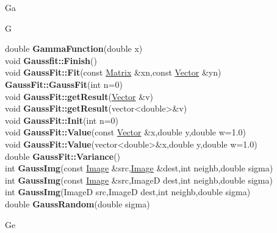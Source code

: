 \documentclass[10pt,titlepage]{article}
\def\functionlistentry#1#2#3#4#5#6{\noindent #1 {\bf #2}(#3) \dotfill #6\\}
\def\letterref#1{}
\def\letterlabel#1{\vspace{0.5cm}\centerline{\Large #1}}
\def\letterlabelend#1{}
\begin{document}
{{\letterlabel{Ga}
\letterlabel{G}
\letterref{A}
\letterref{B}
\letterref{C}
\letterref{D}
\letterref{E}
\letterref{F}
\letterref{G}
\letterref{H}
\letterref{I}
\letterref{K}
\letterref{L}
\letterref{M}
\letterref{N}
\letterref{O}
\letterref{P}
\letterref{Q}
\letterref{R}
\letterref{S}
\letterref{T}
\letterref{U}
\letterref{V}
\letterref{W}
\letterref{X}
\letterref{Y}
\letterref{Z}

\letterref{Ga}
\letterref{Ge}
\letterref{Gr}
\letterlabelend{Ga}
\functionlistentry{double}{GammaFunction}{double x}{1362}{numeric}{}
\functionlistentry{void}{Gaussfit::Finish}{}{1154}{fitting}{}
\functionlistentry{void}{GaussFit::Fit}{const \hyperlink{Matrix}{Matrix} \&xn,const \hyperlink{Vector}{Vector} \&yn}{1155}{fitting}{}
\functionlistentry{}{GaussFit::GaussFit}{int n=0}{1150}{fitting}{}
\functionlistentry{void}{GaussFit::getResult}{\hyperlink{Vector}{Vector} \&v}{1156}{fitting}{}
\functionlistentry{void}{GaussFit::getResult}{vector\textless {}double\textgreater  \&v}{1157}{fitting}{}
\functionlistentry{void}{GaussFit::Init}{int n=0}{1151}{fitting}{}
\functionlistentry{void}{GaussFit::Value}{const \hyperlink{Vector}{Vector} \&x,double y,double w=1.0}{1152}{fitting}{}
\functionlistentry{void}{GaussFit::Value}{vector\textless {}double\textgreater  \&x,double y,double w=1.0}{1153}{fitting}{}
\functionlistentry{double}{GaussFit::Variance}{}{1158}{fitting}{}
\functionlistentry{int}{GaussImg}{const \hyperlink{Image}{Image} \&src,\hyperlink{Image}{Image} \&dest,int neighb,double sigma}{352}{filter}{}
\functionlistentry{int}{GaussImg}{const \hyperlink{Image}{Image} \&src,ImageD dest,int neighb,double sigma}{353}{filter}{}
\functionlistentry{int}{GaussImg}{ImageD src,ImageD dest,int neighb,double sigma}{354}{filter}{}
\functionlistentry{double}{GaussRandom}{double sigma}{862}{statistics}{}

\letterlabel{Ge}
\letterref{A}
\letterref{B}
\letterref{C}
\letterref{D}
\letterref{E}
\letterref{F}
\letterref{G}
\letterref{H}
\letterref{I}
\letterref{K}
\letterref{L}
\letterref{M}
\letterref{N}
\letterref{O}
\letterref{P}
\letterref{Q}
\letterref{R}
\letterref{S}
\letterref{T}
\letterref{U}
\letterref{V}
\letterref{W}
\letterref{X}
\letterref{Y}
\letterref{Z}

}}
\end{document}
